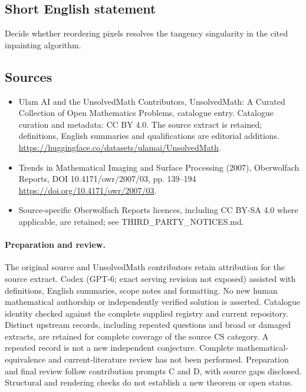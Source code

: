 \documentclass[11pt]{article}
\begin{document}
\subsection{Short English statement}
Decide whether reordering pixels resolves the tangency singularity in the cited inpainting algorithm.
\subsection{Sources}
\begin{itemize}
\item[\hypertarget{source:statement:1}{S1}] Ulam AI and the UnsolvedMath Contributors, UnsolvedMath: A Curated Collection of Open Mathematics Problems, catalogue entry. Catalogue curation and metadata: CC BY 4.0. The source extract is retained; definitions, English summaries and qualifications are editorial additions.
\url{https://huggingface.co/datasets/ulamai/UnsolvedMath}.
\item[\hypertarget{source:statement:2}{S2}] Trends in Mathematical Imaging and Surface Processing (2007), Oberwolfach Reports, DOI 10.4171/owr/2007/03, pp. 139--194
\url{https://doi.org/10.4171/owr/2007/03}.
\item Source-specific Oberwolfach Reports licences, including CC BY-SA 4.0 where applicable, are retained; see THIRD\_PARTY\_NOTICES.md.
\end{itemize}
\paragraph{Preparation and review.}
The original source and UnsolvedMath contributors retain attribution for the source extract. Codex (GPT-6; exact serving revision not exposed) assisted with definitions, English summaries, scope notes and formatting. No new human mathematical authorship or independently verified solution is asserted. Catalogue identity checked against the complete supplied registry and current repository. Distinct upstream records, including repeated questions and broad or damaged extracts, are retained for complete coverage of the source CS category. A repeated record is not a new independent conjecture. Complete mathematical-equivalence and current-literature review has not been performed. Preparation and final review follow contribution prompts C and D, with source gaps disclosed. Structural and rendering checks do not establish a new theorem or open status.
\label{end:statement}
\end{document}
